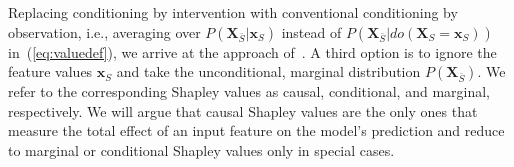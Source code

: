 \documentclass{article}
\newcommand{\vX}{\mathbf{X}}
\newcommand{\vx}{\mathbf{x}}
\newcommand{\expectation}{\mathbb{E}}
\newcommand{\dodo}{\mathit{do}}
\newcommand{\lvdo}[1]{\dodo(\vX_{#1} = \vx_{#1})}
\newcommand{\comment}[1]{{\color{red} #1}}
\begin{document}
Replacing conditioning by intervention with conventional conditioning by observation, i.e., averaging over $P(\vX_{\bar{S}}|\vx_{S})$ instead of $P(\vX_{\bar{S}}|\lvdo{S})$ in~(\ref{eq:valuedef}), we arrive at the approach of~\cite{aas2019explaining,lundberg2018consistent}. A third option is to ignore the feature values $\vx_S$ and take the unconditional, marginal distribution $P(\vX_{\bar{S}})$. We refer to the corresponding Shapley values as causal, conditional, and marginal, respectively. We will argue that causal Shapley values are the only ones that measure the total effect of an input feature on the model's prediction and reduce to marginal or conditional Shapley values only in special cases.

\end{document}
